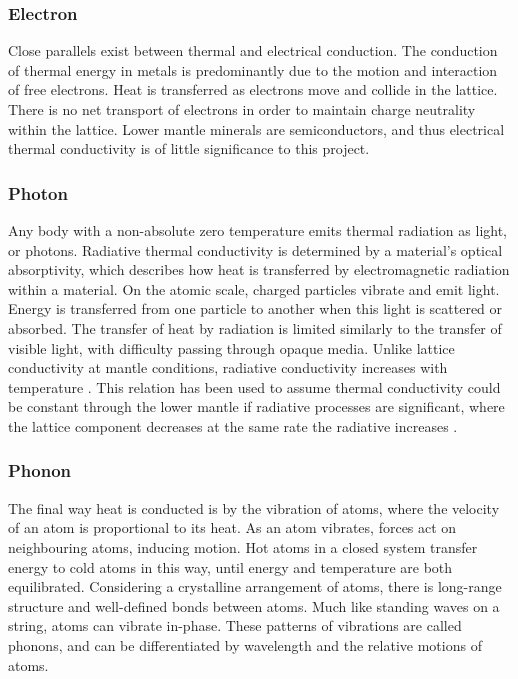 \subsubsection{Electron}

Close parallels exist between thermal and electrical conduction. The conduction of thermal energy in metals is predominantly due to the motion and interaction of free electrons. Heat is transferred as electrons move and collide in the lattice. There is no net transport of electrons in order to maintain charge neutrality within the lattice. Lower mantle minerals are semiconductors, and thus electrical thermal conductivity is of little significance to this project.

\subsubsection{Photon}

Any body with a non-absolute zero temperature emits thermal radiation as light, or photons. Radiative thermal conductivity is determined by a material's optical absorptivity, which describes how heat is transferred by electromagnetic radiation within a material. On the atomic scale, charged particles vibrate and emit light. Energy is transferred from one particle to another when this light is scattered or absorbed. The transfer of heat by radiation is limited similarly to the transfer of visible light, with difficulty passing through opaque media. Unlike lattice conductivity at mantle conditions, radiative conductivity increases with temperature \citep{Hofmeister1999}. This relation has been used to assume thermal conductivity could be constant through the lower mantle if radiative processes are significant, where the lattice component decreases at the same rate the radiative increases \citep{Tang2014}.

\subsubsection{Phonon}

The final way heat is conducted is by the vibration of atoms, where the velocity of an atom is proportional to its heat. As an atom vibrates, forces act on neighbouring atoms, inducing motion. Hot atoms in a closed system transfer energy to cold atoms in this way, until energy and temperature are both equilibrated. Considering a crystalline arrangement of atoms, there is long-range structure and well-defined bonds between atoms. Much like standing waves on a string, atoms can vibrate in-phase. These patterns of vibrations are called phonons, and can be differentiated by wavelength and the relative motions of atoms.

